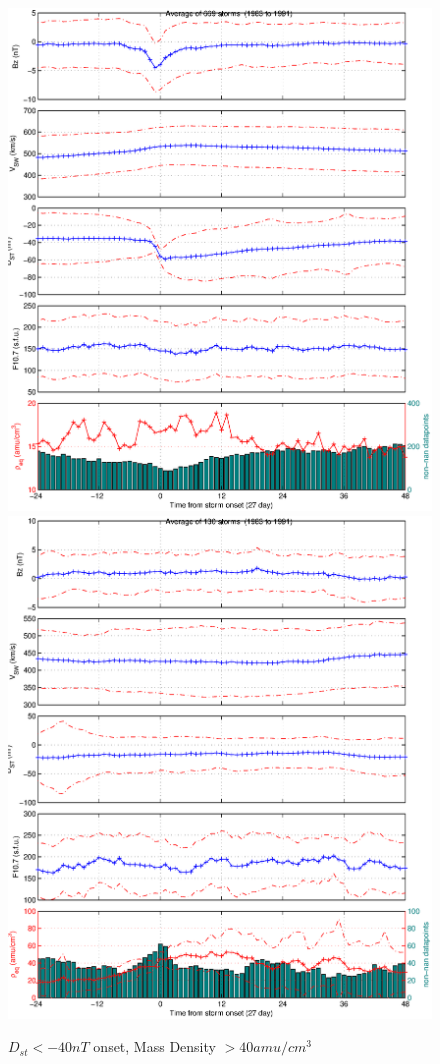 \documentclass[10pt,twocolumn]{article}
\begin{document}
\begin{figure}[htp!]
\centering
\includegraphics[scale=0.5]{paperfigures/stormavs-dst.eps}
\includegraphics[scale=0.5]{paperfigures/stormavs-mass.eps}
\caption{$D_{st}<-40nT$ onset, Mass Density $>40 amu/cm^3$}
\label{MassStorm}
\end{figure}
\clearpage
\end{document}

